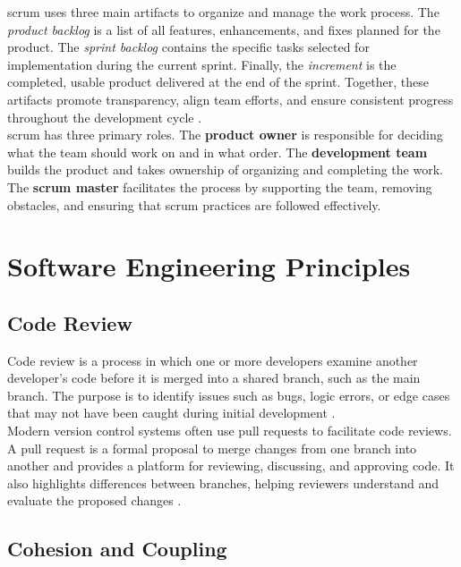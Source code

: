 \newpage

\gls{scrum} uses three main artifacts to organize and manage the work process. The \textit{product backlog} is a list of all features, enhancements, and fixes planned for the product. The \textit{sprint backlog} contains the specific tasks selected for implementation during the current sprint. Finally, the \textit{increment} is the completed, usable product delivered at the end of the sprint. Together, these artifacts promote transparency, align team efforts, and ensure consistent progress throughout the development cycle \cite{scrumguides:scrum}. \\

\gls{scrum} has three primary roles. The \textbf{product owner} is responsible for deciding what the team should work on and in what order. The \textbf{development team} builds the product and takes ownership of organizing and completing the work. The \textbf{\gls{scrum} master} facilitates the process by supporting the team, removing obstacles, and ensuring that \gls{scrum} practices are followed effectively.\\


\section{Software Engineering Principles}
\label{sec:software-engineering-principles}

\subsection{Code Review}
\label{subsec:code-review}

Code review is a process in which one or more developers examine another developer’s code before it is merged into a shared branch, such as the main branch. The purpose is to identify issues such as bugs, logic errors, or edge cases that may not have been caught during initial development \cite{gitlab:code-review}. \\

Modern version control systems often use pull requests to facilitate code reviews. A pull request is a formal proposal to merge changes from one branch into another and provides a platform for reviewing, discussing, and approving code. It also highlights differences between branches, helping reviewers understand and evaluate the proposed changes \cite{github:pr}.

\subsection{Cohesion and Coupling}
\label{subsec:cohesion-and-coupling}

